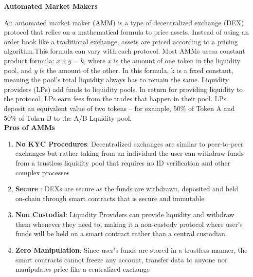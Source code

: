 \documentclass[10pt]{article}
\begin{document}
\textbf{Automated Market Makers}

An automated market maker (AMM) is a type of decentralized exchange (DEX) protocol that relies on a mathematical formula to price assets. Instead of using an order book like a traditional exchange, assets are priced according to a pricing algorithm.This formula can vary with each protocol. Most AMMs usesa constant product formula: $x  \times  y = k$, where $x$ is the amount of one token in the liquidity pool, and $y$ is the amount of the other. In this formula, k is a fixed constant, meaning the pool’s total liquidity always has to remain the same. Liquidity providers (LPs) add funds to liquidity pools. In return for providing liquidity to the protocol, LPs earn fees from the trades that happen in their pool. LPs deposit an equivalent value of two tokens – for example, 50\% of Token A and 50\% of Token B to the A/B Lquidity pool.\\

\textbf{Pros of AMMs}
\begin{enumerate}[leftmargin=+0.2in]
\item \textbf{No KYC Procedures}: Decentralized exchanges are similar to peer-to-peer exchanges but rather taking from an individual the user can withdraw funds from a trustless liquidity pool that requires no ID verification and other complex processes
\item \textbf{Secure} : DEXs are secure as the funds are withdrawn, deposited and held on-chain through smart contracts that is secure and immutable
\item \textbf{Non Custodial}: Liquidity Providers can provide liquidity and withdraw them whenever they need to, making it a non-custody protocol where user's funds will be held on a smart contract rather than a central custodian.
\item \textbf{Zero Manipulation}: Since user's funds are stored in a trustless manner, the smart contracts cannot freeze any account, transfer data to anyone nor manipulates price like a centralized exchange
\end{enumerate}
\end{document}
